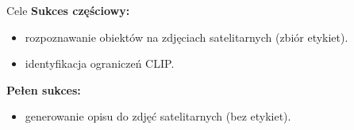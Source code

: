 \documentclass{beamer}
\begin{document}



\begin{frame}{Cele}
  \textbf{Sukces częściowy:}
  \begin{itemize}
    \item rozpoznawanie obiektów na zdjęciach satelitarnych (zbiór etykiet).
    \item identyfikacja ograniczeń CLIP.
  \end{itemize}
  \textbf{Pełen sukces:}
  \begin{itemize}
    \item generowanie opisu do zdjęć satelitarnych (bez etykiet).
  \end{itemize}
\end{frame}
\end{document}
